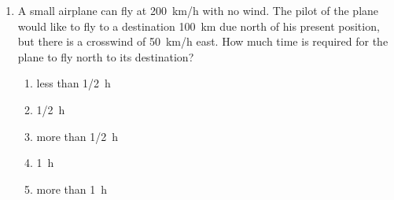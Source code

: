 \documentclass{../../../oss-classkick}
\begin{document}
\begin{multicols*}{2}
\begin{enumerate}[resume,leftmargin=18pt]
  \item A small airplane can fly at \SI{200}{km/h} with no wind. The pilot of
    the plane would like to fly to a destination \SI{100}{km} due north of his
    present position, but there is a crosswind of \SI{50}{km/h} east. How much
    time is required for the plane to fly north to its destination?
    \begin{enumerate}[nosep,leftmargin=18pt,label=(\Alph*)]
    \item less than \SI{1/2}{\hour}
    \item \SI{1/2}{\hour}
    \item more than \SI{1/2}{\hour}
    \item \SI{1}{\hour}
    \item more than \SI{1}{\hour}
    \end{enumerate}
    

\end{enumerate}
\end{multicols*}
\end{document}
